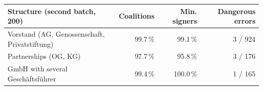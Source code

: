 \begin{tabular}{lrrr}
\toprule
Structure (second batch, 200) & Coalitions & Min. signers & Dangerous errors \\
\midrule
Vorstand (AG, Genossenschaft, Privatstiftung) & 99.7\,\% & 99.1\,\% & 3 / 924 \\
Partnerships (OG, KG) & 97.7\,\% & 95.8\,\% & 3 / 176 \\
GmbH with several Geschäftsführer & 99.4\,\% & 100.0\,\% & 1 / 165 \\
\bottomrule
\end{tabular}
